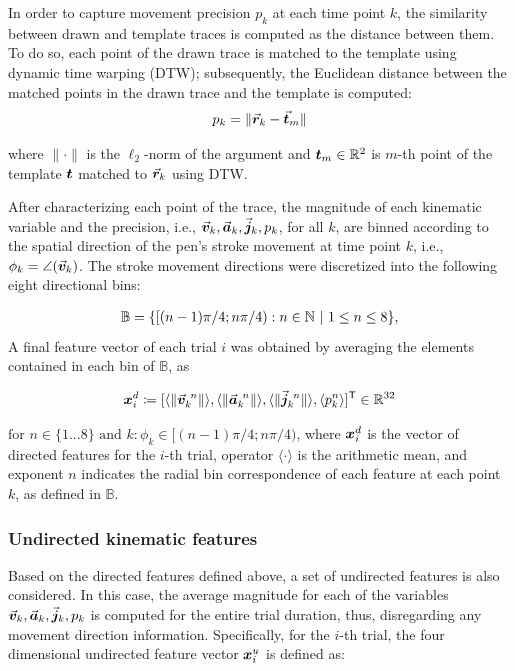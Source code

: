 \documentclass[10pt,a4paper, twocolumn]{article}
\newcommand{\tracepos}{\vec{\ve{r}}}
\newcommand{\speeddir}{\vec{\ve{v}}}
\newcommand{\jerkdir}{\vec{\ve{j}}}
\newcommand{\precisiondir}{{{p}}}
\newcommand{\acceldir}{\vec{\ve{a}}}
\newcommand{\dir}{\phi}
\begin{document}
In order to capture movement precision $\precisiondir_k$ at each time point $k$, the similarity between drawn and template traces is computed as the distance between them. To do so, each point of the drawn trace is matched to the template using dynamic time warping (DTW)\cite{berndt1994using}; subsequently, the Euclidean distance between the matched points in the drawn trace and the template is computed:
\begin{align*}
\precisiondir_k = \|\tracepos_k - \vec{\ve{t}}_m\|
\end{align*}

where $\|\cdot\| $ is the $\ell_2$-norm of the argument and ${\bm {t}}_m \in \mathbb{R}^{2}$ is $m$-th point of the template ${\bm {t}}$ matched to $\tracepos_k$ using DTW.

After characterizing each point of the trace, the magnitude of each kinematic variable and the precision, i.e., $\speeddir_k, \acceldir_k, \jerkdir_k, \precisiondir_k$, for all $k$, are binned according to the spatial direction of the pen's stroke movement at time point $k$, i.e., $\dir_k =  \angle(\speeddir_k)$. The stroke movement directions were discretized into the following eight directional bins:

\begin{align*}
\mathbb{B} = \lbrace \lbrack (n-1)\pi/4; n\pi/4 ) :  n \in \mathbb{N}~|~ 1\leq n \leq 8 \rbrace,
\end{align*}
A final feature vector of each trial $i$ was obtained by averaging the elements contained in each bin of $\mathbb{B} $, as

\begin{align*}
\ve{x}^d_i \coloneqq\lbrack \langle\|\speeddir_k^{~n}\|\rangle , \langle\|\acceldir_k^{~n}\|\rangle, \langle\|\jerkdir_k^{~n}\| \rangle , \langle\precisiondir_k^{n}\rangle \rbrack^\T \in \Real^{32} 
\end{align*}

\noindent $\text{for }  n\in{\lbrace 1...8 \rbrace} \text{ and } {k:\phi_k \in \lbrack (n-1)\pi/4; n\pi/4 )}$, where ${\bm {x}}^d_i$ is the vector of directed features for the $i$-th trial, operator $\langle \cdot \rangle$ is the arithmetic mean, and exponent $n$ indicates the radial bin correspondence of each feature at each point $k$, as defined in $\mathbb{B}$. 

\subsubsection{Undirected kinematic features} Based on the directed features defined above, a set of undirected features is also considered. In this case, the average magnitude for each of the variables  $\speeddir_k, \acceldir_k, \jerkdir_k, \precisiondir_k$ is computed for the entire trial duration, thus, disregarding any movement direction information.  Specifically, for the $i$-th trial, the four dimensional undirected feature vector ${\bm {x}}^u_i$ is defined as:
\end{document}
